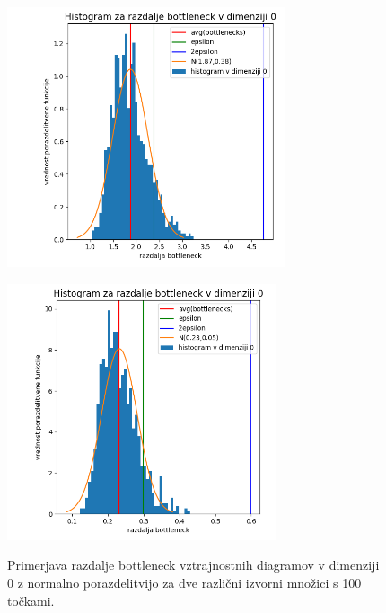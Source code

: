 \documentclass[a4paper,11pt]{article}
\theoremstyle{definition}
\theoremstyle{plain}
\begin{document}
\begin{figure}[ht!]
    \begin{minipage}{0.5\textwidth}
        \centering
        \includegraphics[width=82mm]{../slike/bottleneck_1000_dim0.png}
        \label{slika:hist1_0}
    \end{minipage}\hfill
    \begin{minipage}{0.5\textwidth}
        \centering
        \includegraphics[width=79mm]{../slike/bottleneck2_1000_dim0.png}
        \label{slika:hist2_0}
    \end{minipage}\hfill
    \caption{Primerjava razdalje bottleneck vztrajnostnih diagramov v dimenziji 0 z normalno porazdelitvijo za dve različni izvorni množici s 100 točkami.}
\end{figure}
\end{document}
